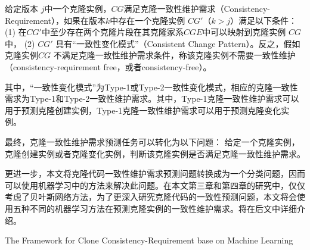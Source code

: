 \begin{definition}
 \label{def-consistency}
给定版本 $j$中一个克隆实例，$CG$满足克隆一致性维护需求（Consistency-Requirement），如果在版本$k$中存在一个克隆实例 $CG'$（$k>j$）满足以下条件： (1) 在$CG'$中至少存在两个克隆片段在其克隆家系$CGE$中可以映射到克隆实例 $CG$中， (2) $CG'$ 具有“一致性变化模式”（Consistent Change Pattern）。反之，假如克隆实例$CG$ 不满足克隆一致性维护需求条件，称该克隆实例不需要一致性维护（consistency-requirement free，或者consistency-free）。
\end{definition}


其中，“一致性变化模式”为Type-1或Type-2一致性变化模式，相应的克隆一致性需求为Type-1和Type-2一致性维护需求。其中，Type-1克隆一致性维护需求可以用于预测克隆创建实例，Type-1克隆一致性维护需求可以用于预测克隆变化实例。

最终，克隆一致性维护需求预测任务可以转化为以下问题：
 给定一个克隆实例，克隆创建实例或者克隆变化实例，判断该克隆实例是否满足克隆一致性维护需求。
 
 更进一步，本文将克隆代码一致性维护需求预测问题转换成为一个分类问题，因而可以使用机器学习中的方法来解决此问题。在本文第三章和第四章的研究中，仅仅考虑了贝叶斯网络方法，为了更深入研究克隆代码的一致性预测问题，本文将会使用五种不同的机器学习方法在预测克隆实例的一致性维护需求。将在后文中详细介绍。


{The Framework for Clone Consistency-Requirement base on Machine Learning}

